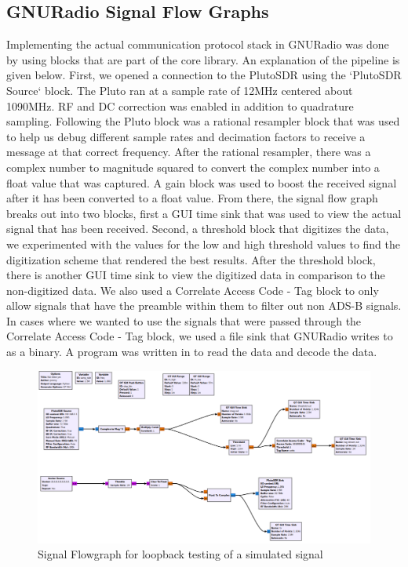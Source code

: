 \documentclass[journal, onecolumn]{IEEEtran}
\begin{document}
\subsection{GNURadio Signal Flow Graphs}
Implementing the actual communication protocol stack in GNURadio was done by using blocks that are part of the core library.
An explanation of the pipeline is given below.
First, we opened a connection to the PlutoSDR using the `PlutoSDR Source` block. 
The Pluto ran at a sample rate of 12MHz centered about 1090MHz.
RF and DC correction was enabled in addition to quadrature sampling.
Following the Pluto block was a rational resampler block that was used to help us debug different sample rates and decimation factors to receive a message at that correct frequency.
After the rational resampler, there was a complex number to magnitude squared to convert the complex number into a float value that was captured.
A gain block was used to boost the received signal after it has been converted to a float value.
From there, the signal flow graph breaks out into two blocks, first a GUI time sink that was used to view the actual signal that has been received.
Second, a threshold block that digitizes the data, we experimented with the values for the low and high threshold values to find the digitization scheme that rendered the best results.
After the threshold block, there is another GUI time sink to view the digitized data in comparison to the non-digitized data.
We also used a Correlate Access Code - Tag block to only allow signals that have the preamble within them to filter out non ADS-B signals.
In cases where we wanted to use the signals that were passed through the Correlate Access Code - Tag block, we used a file sink that GNURadio writes to as a binary.
A program was written in to read the data and decode the data.

\begin{figure}
  \begin{center}
    \includegraphics[width=\textwidth]{./figures/fig_gnuradio_loopback_test.png}
  \end{center}
  \caption{Signal Flowgraph for loopback testing of a simulated signal}\label{fig:loopback_grc}
\end{figure}
\end{document}
